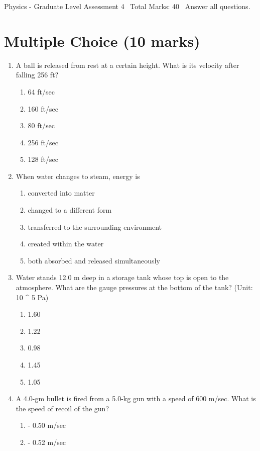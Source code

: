 \documentclass[12pt]{article}
\begin{document}
\begin{center}
Physics - Graduate Level Assessment 4 \
Total Marks: 40 \
Answer all questions.
\end{center}

\section*{Multiple Choice (10 marks)}
\begin{enumerate}[label=\arabic*.]
\item A ball is released from rest at a certain height. What is its velocity after falling 256 ft?
\begin{enumerate}[label=(\alph*)]
    \item 64 ft/sec
    \item 160 ft/sec
    \item 80 ft/sec
    \item 256 ft/sec
    \item 128 ft/sec
\end{enumerate}
\item When water changes to steam, energy is
\begin{enumerate}[label=(\alph*)]
    \item converted into matter
    \item changed to a different form
    \item transferred to the surrounding environment
    \item created within the water
    \item both absorbed and released simultaneously
\end{enumerate}
\item Water stands 12.0 m deep in a storage tank whose top is open to the atmosphere. What are the gauge pressures at the bottom of the tank? (Unit: 10 ^ 5 Pa)
\begin{enumerate}[label=(\alph*)]
    \item 1.60
    \item 1.22
    \item 0.98
    \item 1.45
    \item 1.05
\end{enumerate}
\item A 4.0-gm bullet is fired from a 5.0-kg gun with a speed of 600 m/sec. What is the speed of recoil of the gun?
\begin{enumerate}[label=(\alph*)]
    \item - 0.50 m/sec
    \item - 0.52 m/sec

\end{enumerate}
\end{enumerate}
\end{document}
